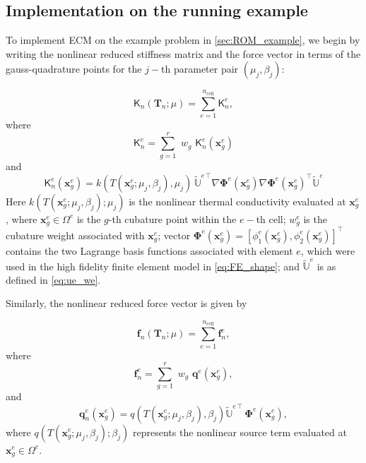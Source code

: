 \documentclass[11pt]{article}
\renewcommand{\vec}[1]{\mathbf{#1}}
\newcommand{\mat}[1]{\mathsf{#1}}
\begin{document}
            \subsection*{Implementation on the running example}
            To implement ECM on the example problem in \cref{sec:ROM_example}, we begin by writing the nonlinear reduced stiffness matrix and the force vector in terms of the gauss-quadrature points for the $j-$th parameter pair $(\mu_j,\beta_j)$:

            \begin{equation}
            	\mat{K}_n(\mathbf{T}_n; \mu)  = \sum_{e=1}^{n_{\text{cell}}} \mat{K}^e_n,
            	\label{eq:elemental_contrib_K_red}
            \end{equation}
            where
            \begin{equation}
            \mat{K}_n^e = \sum_{g=1}^{r}\,\,w_g\,\, \mat{K}_n^e(\vec{x}^e_g)
            \end{equation}
            and
            \begin{equation}
            \mathsf{K}_n^e(\vec{x}^e_g) =  k({T}(\vec{x}^{e}_{g};\mu_j,\beta_j),\mu_j)\,\widetilde{\mathbb{U}}^{e\,\top}{\nabla \boldsymbol\Phi}^e(\vec{x}^{e}_g) {\nabla\boldsymbol\Phi}^e(\vec{x}^{e}_g)^\top\widetilde{\mathbb{U}}^e
            \label{eq:elemental_stiffness_matrix}
            \end{equation}
            Here $k({T}(\vec{x}^{e}_{g};\mu_j,\beta_j);\mu_j)$ is the nonlinear thermal conductivity evaluated at $\vec{x}^e_g$, where $\vec{x}^{e}_g\in \Omega^e$ is the $g$-th cubature point within the $e-$th cell; $w^{e}_g$ is the cubature weight associated with $\vec{x}^{e}_g$; vector $\boldsymbol\Phi^e(\vec{x}^{e}_g) = [\phi^{e}_1(\vec{x}^{e}_g),\phi^{e}_2(\vec{x}^{e}_g)]^\top$ contains the two Lagrange basis functions associated with element $e$, which were used in the high fidelity finite element model in \cref{eq:FE_shape}; and $\widetilde{\mathbb{U}}^e$ is as defined in \cref{eq:ue_we}.


            Similarly, the nonlinear reduced force vector is given by

            \begin{equation}
            	\vec{f}_n(\mathbf{T}_n; \mu) = \sum_{e=1}^{n_{\text{cell}}} \vec{f}^e_n,
            	\label{eq:elemental_contrib_f_red}
            \end{equation}
            where
            \begin{equation}
            	\vec{f}^e_n = \sum_{g=1}^{r} \,\, w_g \,\, \vec{q}^e(\vec{x}^e_g),
            	\label{eq:elemental_force_vector}
            \end{equation}
            and
            \begin{equation}
            \vec{q}_n^e(\vec{x}^e_g) = q(T(\vec{x}^{e}_{g}; \mu_j, \beta_j),\beta_j) \widetilde{\mathbb{U}}^{e\,\top} \, \boldsymbol\Phi^{e}(\vec{x}^{e}_g),
            \label{eq:source_term_expression}
            \end{equation}
            where \( q({T}(\vec{x}^{e}_{g};\mu_j,\beta_j);\beta_j) \) represents the nonlinear source term evaluated at $\vec{x}^e_g\in\Omega^e$.
\end{document}
